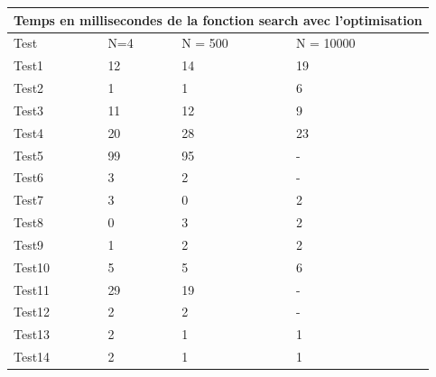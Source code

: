 \documentclass[utf8]{article}
\begin{document}
\begin{large}
\begin{tabular}{ |p{3cm}||p{3cm}|p{3cm}|p{3cm}|  }
        \hline
    \end{tabular}

    \begin{tabular}{ |p{3cm}||p{3cm}|p{3cm}|p{3cm}|  }
        \hline
        \multicolumn{4}{|c|}{Temps en millisecondes de la fonction search avec l'optimisation} \\
        \hline
        Test   & N=4 & N = 500 & N = 10000                                                     \\
        \hline
        Test1  & 12  & 14      & 19                                                            \\
        Test2  & 1   & 1       & 6                                                             \\
        Test3  & 11  & 12      & 9                                                             \\
        Test4  & 20  & 28      & 23                                                            \\
        Test5  & 99  & 95      & -                                                             \\
        Test6  & 3   & 2       & -                                                             \\
        Test7  & 3   & 0       & 2                                                             \\
        Test8  & 0   & 3       & 2                                                             \\
        Test9  & 1   & 2       & 2                                                             \\
        Test10 & 5   & 5       & 6                                                             \\
        Test11 & 29  & 19      & -                                                             \\
        Test12 & 2   & 2       & -                                                             \\
        Test13 & 2   & 1       & 1                                                             \\
        Test14 & 2   & 1       & 1                                                             \\
        \hline
    \end{tabular}




\end{large}
\end{document}
